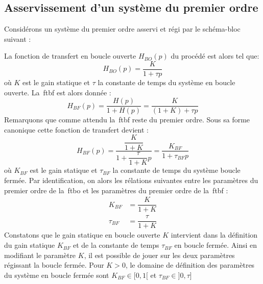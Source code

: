 \subsection{Asservissement d'un système du premier ordre}
Considérons un système du premier ordre asservi et régi par le schéma-bloc 
suivant :
\begin{center}
    
\end{center}
La fonction de transfert en boucle ouverte $H_{BO}(p)$ du procédé est alors 
tel que:
\[
H_{BO}(p)=\dfrac{K}{1+\tau p}
\]
où $K$ est le gain statique et $\tau$ la constante de temps 
du système en boucle ouverte. 
La~\gls{ftbf} est alors donnée :
\[
H_{BF}(p)=\dfrac{H(p)}{1+H(p)}=\dfrac{K}{(1+K)+\tau p}
\]
Remarquons que comme attendu la~\gls{ftbf} reste du premier ordre. 
Sous sa forme canonique cette fonction de transfert devient :
\[
H_{BF}(p)=\dfrac{\dfrac{K}{1+K}}{1+\dfrac{\tau}{1+K}p}
=\dfrac{K_{BF}}{1+\tau_{BF} p}
\]
où $K_{BF}$ est le gain statique et $\tau_{BF}$ la constante de temps du 
système boucle fermée. Par identification, on alors les rélations suivantes 
entre les paramètres du premier ordre de la~\gls{ftbo} et les paramètres du 
premier ordre de la~\gls{ftbf} :
\begin{align*}
       K_{BF}&=\dfrac{K}{1+K}\\
    \tau_{BF}&=\dfrac{\tau}{1+K}
\end{align*}
Constatons que le gain statique en boucle ouverte $K$ intervient 
dans la définition du gain statique $K_{BF}$ et de la constante de temps 
$\tau_{BF}$ en boucle fermée. Ainsi en modifiant le paramètre $K$, il est 
possible de jouer sur les deux paramètres régissant la boucle fermée.
Pour $K>0$, le domaine de définition des paramètres du système en boucle 
fermée sont  $K_{BF}\in[0,1[$ et  $\tau_{BF}\in]0,\tau]$
